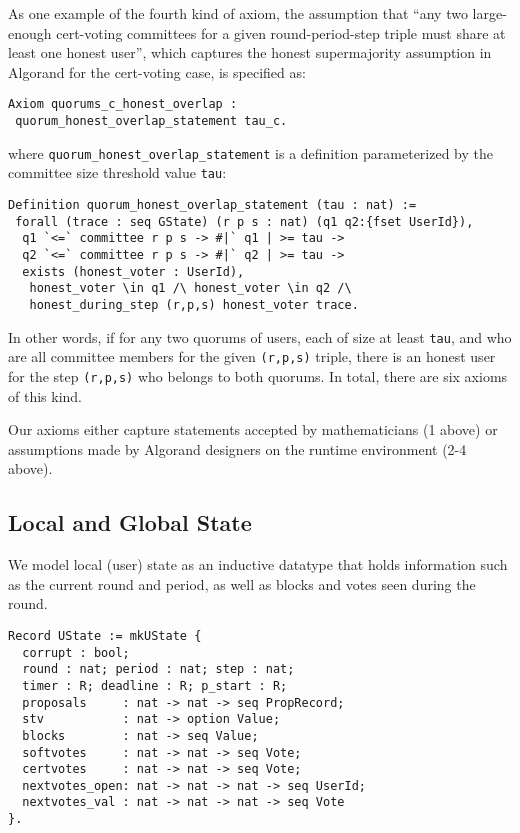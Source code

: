 As one example of the fourth kind of axiom, the assumption that ``any two large-enough cert-voting committees for a given round-period-step triple must share at least one honest user'', which captures the honest supermajority assumption in Algorand for the cert-voting case, is specified as:
\begin{lstlisting}[language=Coq]
Axiom quorums_c_honest_overlap :
 quorum_honest_overlap_statement tau_c.
\end{lstlisting}
where \lstinline{quorum_honest_overlap_statement} is a definition parameterized by the committee size threshold value \lstinline{tau}:
\begin{lstlisting}[language=Coq]
Definition quorum_honest_overlap_statement (tau : nat) :=
 forall (trace : seq GState) (r p s : nat) (q1 q2:{fset UserId}),
  q1 `<=` committee r p s -> #|` q1 | >= tau ->					
  q2 `<=` committee r p s -> #|` q2 | >= tau ->					
  exists (honest_voter : UserId),
   honest_voter \in q1 /\ honest_voter \in q2 /\
   honest_during_step (r,p,s) honest_voter trace.
\end{lstlisting}
In other words, if for any two quorums of users, each of size at least \lstinline{tau}, and who are all committee members for the given \lstinline{(r,p,s)} triple, there is an honest user for the step \lstinline{(r,p,s)} who belongs to both quorums. In total, there are six axioms of this kind.

Our axioms either capture statements accepted by mathematicians (1 above) or assumptions made by Algorand designers on the runtime environment (2-4 above).

\subsection{Local and Global State}

We model local (user) state as an inductive datatype that holds information such as the current round and period, as well as blocks and votes seen during the round.

\begin{lstlisting}[language=Coq]
Record UState := mkUState {
  corrupt : bool;
  round : nat; period : nat; step : nat;
  timer : R; deadline : R; p_start : R;
  proposals     : nat -> nat -> seq PropRecord;
  stv           : nat -> option Value;
  blocks        : nat -> seq Value;
  softvotes     : nat -> nat -> seq Vote;
  certvotes     : nat -> nat -> seq Vote;
  nextvotes_open: nat -> nat -> nat -> seq UserId;
  nextvotes_val : nat -> nat -> nat -> seq Vote
}.
\end{lstlisting}

